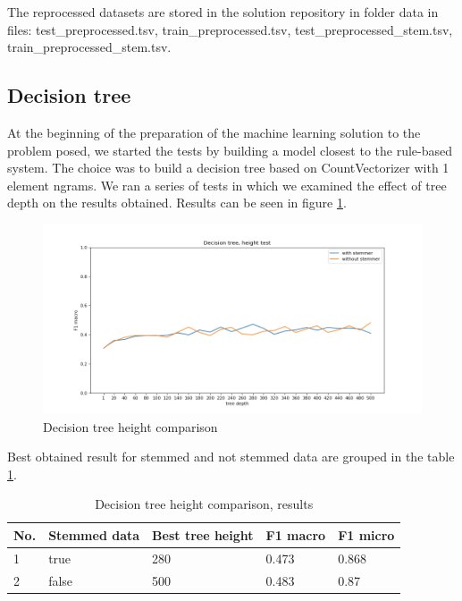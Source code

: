 \documentclass[a4paper]{article}
\begin{document}
The reprocessed datasets are stored in the solution repository in folder data in files: test\_preprocessed.tsv, train\_preprocessed.tsv, test\_preprocessed\_stem.tsv, train\_preprocessed\_stem.tsv.

\subsection{Decision tree}

At the beginning of the preparation of the machine learning solution to the problem posed, we started the tests by building a model closest to the rule-based system. The choice was to build a decision tree based on CountVectorizer with 1 element ngrams. We ran a series of tests in which we examined the effect of tree depth on the results obtained. Results can be seen in figure \ref{fig:decision_tree_height_comparison}. 

\begin{figure}[h]
\centering
\includegraphics[width=\textwidth]{plots/decision_tree_height_comparison.png}
\caption{Decision tree height comparison}
\label{fig:decision_tree_height_comparison}
\end{figure}

Best obtained result for stemmed and not stemmed data are grouped in the table \ref{tab:decision_tree_hc_results}.

\begin{table}[h]
\centering
\begin{tabular}{|l|l|l|l|l|}
\hline
No. & Stemmed data & Best tree height & F1 macro & F1 micro \\ \hline
1   & true         & 280              & 0.473    & 0.868    \\ \hline
2   & false        & 500              & 0.483    & 0.87     \\ \hline
\end{tabular}
\caption{Decision tree height comparison, results}
\label{tab:decision_tree_hc_results}
\end{table}
\end{document}
